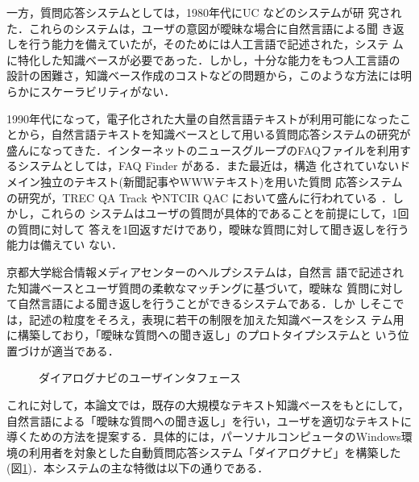 一方，質問応答システムとしては，1980年代にUC \cite{UC}などのシステムが研
究された．これらのシステムは，ユーザの意図が曖昧な場合に自然言語による聞
き返しを行う能力を備えていたが，そのためには人工言語で記述された，システ
ムに特化した知識ベースが必要であった．しかし，十分な能力をもつ人工言語の
設計の困難さ，知識ベース作成のコストなどの問題から，このような方法には明
らかにスケーラビリティがない．

1990年代になって，電子化された大量の自然言語テキストが利用可能になったこ
とから，自然言語テキストを知識ベースとして用いる質問応答システムの研究が
盛んになってきた．インターネットのニュースグループのFAQファイルを利用す
るシステムとしては，FAQ Finder \cite{Hammond95}がある．また最近は，構造
化されていないドメイン独立のテキスト(新聞記事やWWWテキスト)を用いた質問
応答システムの研究が，TREC QA Track \cite{TREC9}やNTCIR QAC \cite{QAC} 
において盛んに行われている
\cite{Harabagiu01,TREC_LIMSI,QAC_Murata,QAC_Kawahara}．しかし，これらの
システムはユーザの質問が具体的であることを前提にして，1回の質問に対して
答えを1回返すだけであり，曖昧な質問に対して聞き返しを行う能力は備えてい
ない．

京都大学総合情報メディアセンターのヘルプシステム\cite{Kuro00}は，自然言
語で記述された知識ベースとユーザ質問の柔軟なマッチングに基づいて，曖昧な
質問に対して自然言語による聞き返しを行うことができるシステムである．しか
しそこでは，記述の粒度をそろえ，表現に若干の制限を加えた知識ベースをシス
テム用に構築しており，「曖昧な質問への聞き返し」のプロトタイプシステムと
いう位置づけが適当である．


\begin{figure}
 \begin{center}

\caption{ダイアログナビのユーザインタフェース} 
\label{fig:user_interface}
 \end{center}
\end{figure}

これに対して，本論文では，既存の大規模なテキスト知識ベースをもとにして，
自然言語による「曖昧な質問への聞き返し」を行い，ユーザを適切なテキストに
導くための方法を提案する．具体的には，パーソナルコンピュータのWindows環
境の利用者を対象とした自動質問応答システム「ダイアログナビ」を構築した
(図\ref{fig:user_interface})．本システムの主な特徴は以下の通りである．



